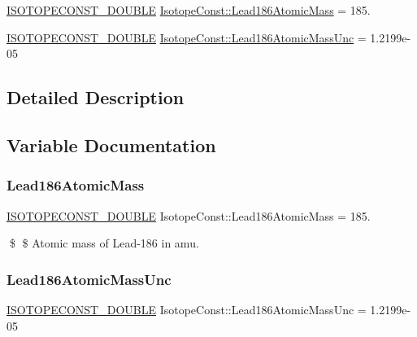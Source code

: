 \begin{DoxyCompactItemize}
\item 
\mbox{\hyperlink{group___isotope_const-_macros_ga8f45a7272ce02c0b4c65c44636ed719a}{I\+S\+O\+T\+O\+P\+E\+C\+O\+N\+S\+T\+\_\+\+D\+O\+U\+B\+LE}} \mbox{\hyperlink{group___isotope_const-_lead-_pb186_ga53ea0354baf474f72159706841c8db5a}{Isotope\+Const\+::\+Lead186\+Atomic\+Mass}} = 185.
\item 
\mbox{\hyperlink{group___isotope_const-_macros_ga8f45a7272ce02c0b4c65c44636ed719a}{I\+S\+O\+T\+O\+P\+E\+C\+O\+N\+S\+T\+\_\+\+D\+O\+U\+B\+LE}} \mbox{\hyperlink{group___isotope_const-_lead-_pb186_ga1356eff379bbf745c8e1c27704a7ecc7}{Isotope\+Const\+::\+Lead186\+Atomic\+Mass\+Unc}} = 1.\+2199e-\/05
\end{DoxyCompactItemize}


\subsection{Detailed Description}


\subsection{Variable Documentation}
\mbox{\label{group___isotope_const-_lead-_pb186_ga53ea0354baf474f72159706841c8db5a}} 
\subsubsection{\texorpdfstring{Lead186\+Atomic\+Mass}{Lead186AtomicMass}}
{\footnotesize\ttfamily \mbox{\hyperlink{group___isotope_const-_macros_ga8f45a7272ce02c0b4c65c44636ed719a}{I\+S\+O\+T\+O\+P\+E\+C\+O\+N\+S\+T\+\_\+\+D\+O\+U\+B\+LE}} Isotope\+Const\+::\+Lead186\+Atomic\+Mass = 185.}

\$ \$ Atomic mass of Lead-\/186 in amu. \mbox{\label{group___isotope_const-_lead-_pb186_ga1356eff379bbf745c8e1c27704a7ecc7}} 
\subsubsection{\texorpdfstring{Lead186\+Atomic\+Mass\+Unc}{Lead186AtomicMassUnc}}
{\footnotesize\ttfamily \mbox{\hyperlink{group___isotope_const-_macros_ga8f45a7272ce02c0b4c65c44636ed719a}{I\+S\+O\+T\+O\+P\+E\+C\+O\+N\+S\+T\+\_\+\+D\+O\+U\+B\+LE}} Isotope\+Const\+::\+Lead186\+Atomic\+Mass\+Unc = 1.\+2199e-\/05}

